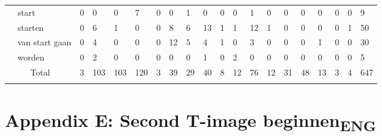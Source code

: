 \begin{tabularx}{\textwidth}{XXXXXXXXXXXXXXXXXXXX}
& start &  0 &  0 &  0 &  7 &  0 &  0 &  1 &  0 &  0 &  0 &  1 &  0 &  0 &  0 &  0 &  0 &  0 &  9\\
& starten &  0 &  6 &  1 &  0 &  0 &  8 &  6 &  13 &  1 &  1 &  12 &  1 &  0 &  0 &  0 &  0 &  1 &  50\\
& van start gaan &  0 &  4 &  0 &  0 &  0 &  12 &  5 &  4 &  1 &  0 &  3 &  0 &  0 &  0 &  1 &  0 &  0 &  30\\
& worden &  0 &  2 &  0 &  0 &  0 &  0 &  0 &  1 &  0 &  2 &  0 &  0 &  0 &  0 &  0 &  0 &  0 &  5\\
\multicolumn{2}{c}{Total} &  3 &  103 &  103 &  120 &  3 &  39 &  29 &  40 &  8 &  12 &  76 &  12 &  31 &  48 &  13 &  3 &  4 &  647\\
\lspbottomrule
\end{tabularx}
\section{Appendix E: Second T-image beginnen\textsubscript{ENG}}


